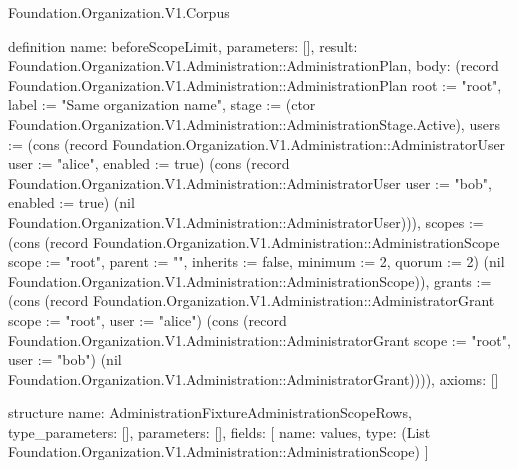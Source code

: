 \begin{lexlean}{Foundation.Organization.V1.Corpus}
\begin{semanticmodule}
definition{
  name: beforeScopeLimit,
  parameters: [],
  result: Foundation.Organization.V1.Administration::AdministrationPlan,
  body: (record Foundation.Organization.V1.Administration::AdministrationPlan {root := "root", label := "Same organization name", stage := (ctor Foundation.Organization.V1.Administration::AdministrationStage.Active), users := (cons (record Foundation.Organization.V1.Administration::AdministratorUser {user := "alice", enabled := true}) (cons (record Foundation.Organization.V1.Administration::AdministratorUser {user := "bob", enabled := true}) (nil Foundation.Organization.V1.Administration::AdministratorUser))), scopes := (cons (record Foundation.Organization.V1.Administration::AdministrationScope {scope := "root", parent := "", inherits := false, minimum := 2, quorum := 2}) (nil Foundation.Organization.V1.Administration::AdministrationScope)), grants := (cons (record Foundation.Organization.V1.Administration::AdministratorGrant {scope := "root", user := "alice"}) (cons (record Foundation.Organization.V1.Administration::AdministratorGrant {scope := "root", user := "bob"}) (nil Foundation.Organization.V1.Administration::AdministratorGrant)))}),
  axioms: []
}

structure{
  name: AdministrationFixtureAdministrationScopeRows,
  type_parameters: [],
  parameters: [],
  fields: [
    {name: values, type: (List Foundation.Organization.V1.Administration::AdministrationScope)}
  ]
}


\end{semanticmodule}
\end{lexlean}
